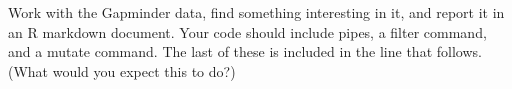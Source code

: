 \documentclass[
  openany]{book}
\newenvironment{Shaded}{\begin{snugshade}}{\end{snugshade}}
\newcommand{\DataTypeTok}[1]{\textcolor[rgb]{0.13,0.29,0.53}{#1}}
\newcommand{\FloatTok}[1]{\textcolor[rgb]{0.00,0.00,0.81}{#1}}
\newcommand{\KeywordTok}[1]{\textcolor[rgb]{0.13,0.29,0.53}{\textbf{#1}}}
\newcommand{\NormalTok}[1]{#1}
\newcommand{\OperatorTok}[1]{\textcolor[rgb]{0.81,0.36,0.00}{\textbf{#1}}}
\newcommand{\StringTok}[1]{\textcolor[rgb]{0.31,0.60,0.02}{#1}}
\begin{document}
Work with the Gapminder data, find something interesting in it, and report it in an R markdown document. Your code should include pipes, a filter command, and a mutate command. The last of these is included in the line that follows. (What would you expect this to do?)

\begin{Shaded}
\end{Shaded}

  
\end{document}
